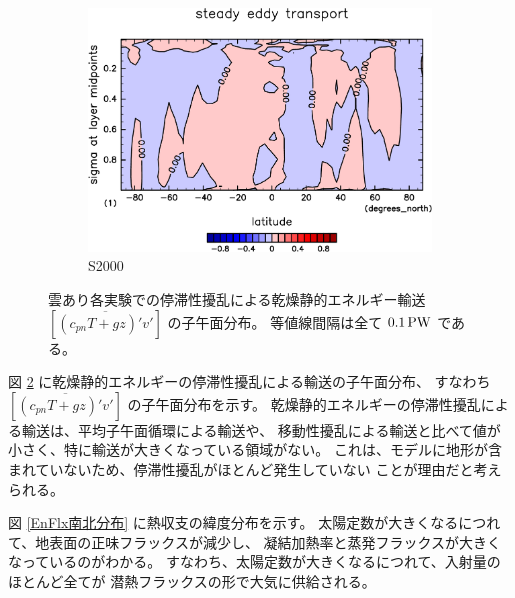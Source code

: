 \documentclass[body]{subfiles}
\begin{document}
\begin{figure}[t]
\begin{subfigure}{.4\textwidth}
		\includegraphics[width=\textwidth]{S2000/MeriHeatTransTest@dryStatEn_SE,time=7300:7665-crop-rotate.pdf}
		\caption{S2000}\label{乾燥静的エネルギー停滞性擾乱S2000}
	\end{subfigure}
	\caption[雲あり各実験でのに停滞性擾乱依る乾燥静的エネルギー輸送の子午面分布]{
		雲あり各実験での停滞性擾乱による乾燥静的エネルギー輸送 \([\overline{(c_{pn}T+gz)'v'}]\) の子午面分布。
		等値線間隔は全て \(0.1\hmu{PW}\) である。
	}\label{乾燥静的エネルギー停滞性擾乱}
\end{figure}

図 \ref{乾燥静的エネルギー停滞性擾乱} に乾燥静的エネルギーの停滞性擾乱による輸送の子午面分布、
すなわち \([\overline{(c_{pn}T+gz)'v'}]\) の子午面分布を示す。
乾燥静的エネルギーの停滞性擾乱による輸送は、平均子午面循環による輸送や、
移動性擾乱による輸送と比べて値が小さく、特に輸送が大きくなっている領域がない。
これは、モデルに地形が含まれていないため、停滞性擾乱がほとんど発生していない
ことが理由だと考えられる。

\afterpage{\clearpage}

図 \ref{EnFlx南北分布} に熱収支の緯度分布を示す。
太陽定数が大きくなるにつれて、地表面の正味フラックスが減少し、
凝結加熱率と蒸発フラックスが大きくなっているのがわかる。
すなわち、太陽定数が大きくなるにつれて、入射量のほとんど全てが
潜熱フラックスの形で大気に供給される。
\end{document}
